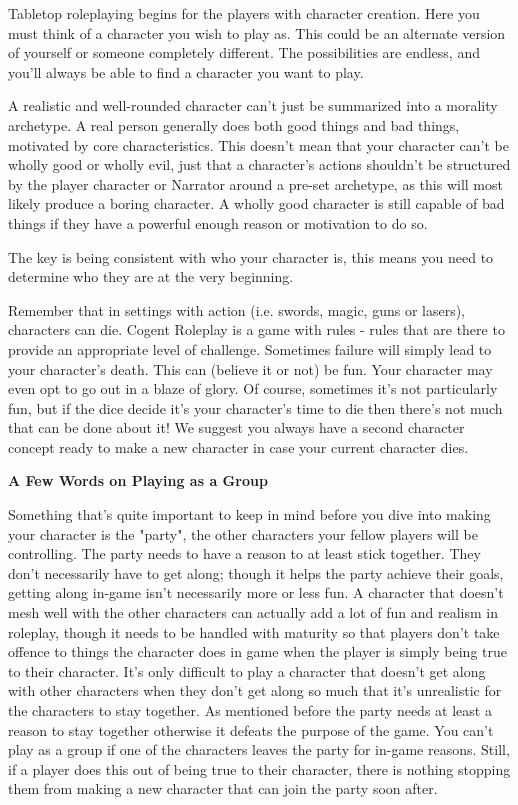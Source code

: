 Tabletop roleplaying begins for the players with character creation. Here you must think of a character you wish to play as. This could be an alternate version of yourself or someone completely different. The possibilities are endless, and you'll always be able to find a character you want to play.

A realistic and well-rounded character can't just be summarized into a morality archetype. A real person generally does both good things and bad things, motivated by core characteristics. This doesn't mean that your character can't be wholly good or wholly evil, just that a character's actions shouldn't be structured by the player character or Narrator around a pre-set archetype, as this will most likely produce a boring character. A wholly good character is still capable of bad things if they have a powerful enough reason or motivation to do so.

The key is being consistent with who your character is, this means you need to determine who they are at the very beginning.

Remember that in settings with action (i.e. swords, magic, guns or lasers), characters can die. Cogent Roleplay is a game with rules - rules that are there to provide an appropriate level of challenge. Sometimes failure will simply lead to your character's death. This can (believe it or not) be fun. Your character may even opt to go out in a blaze of glory. Of course, sometimes it's not particularly fun, but if the dice decide it's your character's time to die then there's not much that can be done about it! We suggest you always have a second character concept ready to make a new character in case your current character dies.

\begin{displayquote}
\textbf{A Few Words on Playing as a Group}

Something that's quite important to keep in mind before you dive into making your character is the "party", the other characters your fellow players will be controlling. The party needs to have a reason to at least stick together. They don't necessarily have to get along; though it helps the party achieve their goals, getting along in-game isn't necessarily more or less fun. 
A character that doesn't mesh well with the other characters can actually add a lot of fun and realism in roleplay, though it needs to be handled with maturity so that players don't take offence to things the character does in game when the player is simply being true to their character. It's only difficult to play a character that doesn't get along with other characters when they don't get along so much that it's unrealistic for the characters to stay together. As mentioned before the party needs at least a reason to stay together otherwise it defeats the purpose of the game. You can't play as a group if one of the characters leaves the party for in-game reasons. Still, if a player does this out of being true to their character, there is nothing stopping them from making a new character that can join the party soon after.
\end{displayquote}

